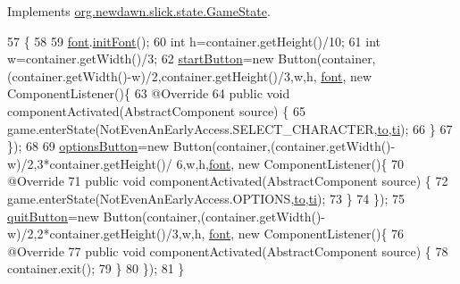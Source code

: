 Implements \mbox{\hyperlink{interfaceorg_1_1newdawn_1_1slick_1_1state_1_1_game_state_aa799a369e0fcfe6822d2d586fa6f5bbc}{org.\+newdawn.\+slick.\+state.\+Game\+State}}.


\begin{DoxyCode}
57                                                                                                      \{
58         
59         \mbox{\hyperlink{classstates_1_1_main_menu_a045edf02b97294df356a8101adaa11c3}{font}}.\mbox{\hyperlink{classgui_1_1_g_u_i_font_ae1fccb6783e7c0f11fdcedd36362585d}{initFont}}();
60         \textcolor{keywordtype}{int} h=container.getHeight()/10;
61         \textcolor{keywordtype}{int} w=container.getWidth()/3;
62         \mbox{\hyperlink{classstates_1_1_main_menu_a0b5fdbfec57ada5a6161f4b2dbc1bfe8}{startButton}}=\textcolor{keyword}{new} Button(container,(container.getWidth()-w)/2,container.getHeight()/3,w,h,
      \mbox{\hyperlink{classstates_1_1_main_menu_a045edf02b97294df356a8101adaa11c3}{font}}, \textcolor{keyword}{new} ComponentListener()\{
63             @Override
64             \textcolor{keyword}{public} \textcolor{keywordtype}{void} componentActivated(AbstractComponent source) \{
65                 game.enterState(NotEvenAnEarlyAccess.SELECT\_CHARACTER,\mbox{\hyperlink{classstates_1_1_main_menu_a7443336a416646891958e073289b2a50}{to}},\mbox{\hyperlink{classstates_1_1_main_menu_ab7c88b387c4beb4042ffd45d6b513c23}{ti}});
66             \}
67         \});
68         
69         \mbox{\hyperlink{classstates_1_1_main_menu_a7e45c28d037c0d5daeb94b99ff83e81e}{optionsButton}}=\textcolor{keyword}{new} Button(container,(container.getWidth()-w)/2,3*container.getHeight()/
      6,w,h,\mbox{\hyperlink{classstates_1_1_main_menu_a045edf02b97294df356a8101adaa11c3}{font}}, \textcolor{keyword}{new} ComponentListener()\{
70             @Override
71             \textcolor{keyword}{public} \textcolor{keywordtype}{void} componentActivated(AbstractComponent source) \{
72                 game.enterState(NotEvenAnEarlyAccess.OPTIONS,\mbox{\hyperlink{classstates_1_1_main_menu_a7443336a416646891958e073289b2a50}{to}},\mbox{\hyperlink{classstates_1_1_main_menu_ab7c88b387c4beb4042ffd45d6b513c23}{ti}});
73             \}
74         \});
75         \mbox{\hyperlink{classstates_1_1_main_menu_ab0fc474be86201071427780c6c500dbb}{quitButton}}=\textcolor{keyword}{new} Button(container,(container.getWidth()-w)/2,2*container.getHeight()/3,w,h,
      \mbox{\hyperlink{classstates_1_1_main_menu_a045edf02b97294df356a8101adaa11c3}{font}}, \textcolor{keyword}{new} ComponentListener()\{
76             @Override
77             \textcolor{keyword}{public} \textcolor{keywordtype}{void} componentActivated(AbstractComponent source) \{
78                 container.exit();
79             \}
80         \});
81     \}
\end{DoxyCode}
\mbox{\label{classstates_1_1_main_menu_ad36f80560779b3cf28f76f2a44d640de}} 
